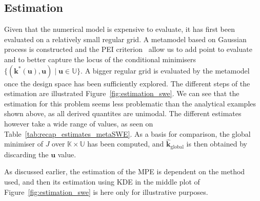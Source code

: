\documentclass[preprint, 1p]{elsarticle}
\newcommand{\kest}{\hat{\mathbf{k}}}
\newcommand{\Kspace}{\mathbb{K}}
\newcommand{\Uspace}{\mathbb{U}}
\begin{document}
\subsection{Estimation}
Given that the numerical model is expensive to evaluate, it has first been evaluated on a relatively small regular grid. A metamodel based on Gaussian process is constructed and the PEI criterion~\citep{ginsbourger_bayesian_2014,bossek_learning_2015} allow us to add point to evaluate and to better capture the locus of the conditional minimisers $\{(\mathbf{k}^*(\mathbf{u}), \mathbf{u}) \mid \mathbf{u} \in \Uspace \}$. A bigger regular grid is evaluated by the metamodel once the design space has been sufficiently explored. The different steps of the estimation are illustrated Figure~\ref{fig:estimation_swe}. We can see that the estimation for this problem seems less problematic than the analytical examples shown above, as all derived quantites are unimodal.
The different estimates however take a wide range of values, as seen on Table~\ref{tab:recap_estimates_metaSWE}. As a basis for comparison, the global minimiser of $J$ over $\Kspace \times \Uspace$ has been computed, and $\kest_{\mathrm{global}}$ is then obtained by discarding the $\mathbf{u}$ value.

As discussed earlier, the estimation of the MPE is dependent on the method used, and then its estimation using KDE in the middle plot of Figure~\ref{fig:estimation_swe} is here only for illustrative purposes.
\end{document}

